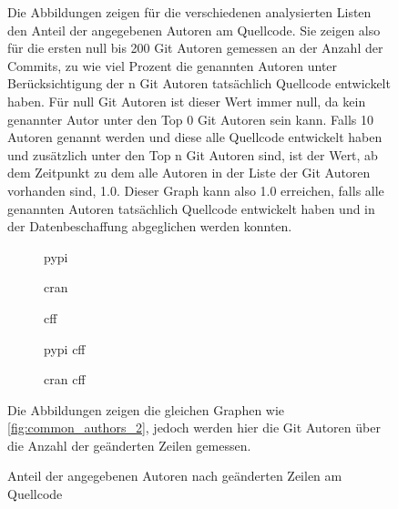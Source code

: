 \begin{figure}
    Die Abbildungen zeigen für die verschiedenen analysierten Listen den Anteil der angegebenen Autoren am Quellcode. Sie zeigen also für die ersten null bis 200 Git Autoren gemessen an der Anzahl der Commits, zu wie viel Prozent die genannten Autoren unter Berücksichtigung der n Git Autoren tatsächlich Quellcode entwickelt haben. Für null Git Autoren ist dieser Wert immer null, da kein genannter Autor unter den Top 0 Git Autoren sein kann. Falls 10 Autoren genannt werden und diese alle Quellcode entwickelt haben und zusätzlich unter den Top n Git Autoren sind, ist der Wert, ab dem Zeitpunkt zu dem alle Autoren in der Liste der Git Autoren vorhanden sind, 1.0. Dieser Graph kann also 1.0 erreichen, falls alle genannten Autoren tatsächlich Quellcode entwickelt haben und in der Datenbeschaffung abgeglichen werden konnten.
\end{figure}

\begin{figure}
    \begin{subfigure}{.5\textwidth}
        \centering
        
        \caption{\gls{pypi}}
        \label{fig:common_authors_2_by_files_pypi}
    \end{subfigure}%
    \begin{subfigure}{.5\textwidth}
        \centering
        
        \caption{\gls{cran}}
        \label{fig:common_authors_2_by_files_cran}
    \end{subfigure}
    \begin{subfigure}{.5\textwidth}
        \centering
        
        \caption{\gls{cff}}
        \label{fig:common_authors_2_by_files_cff}
    \end{subfigure}%
    \begin{subfigure}{.5\textwidth}
        \centering
        
        \caption{\gls{pypi} \gls{cff}}
        \label{fig:common_authors_2_by_files_pypi_cff}
    \end{subfigure}
    \centering
    \begin{subfigure}{.5\textwidth}
        \centering
        
        \caption{\gls{cran} \gls{cff}}
        \label{fig:common_authors_2_by_files_cran_cff}
    \end{subfigure}
    \caption{Anteil der angegebenen Autoren nach geänderten Zeilen am Quellcode}
    \label{fig:common_authors_2_by_files}
    \small
    Die Abbildungen zeigen die gleichen Graphen wie \autoref{fig:common_authors_2}, jedoch werden hier die Git Autoren über die Anzahl der geänderten Zeilen gemessen.
\end{figure}

